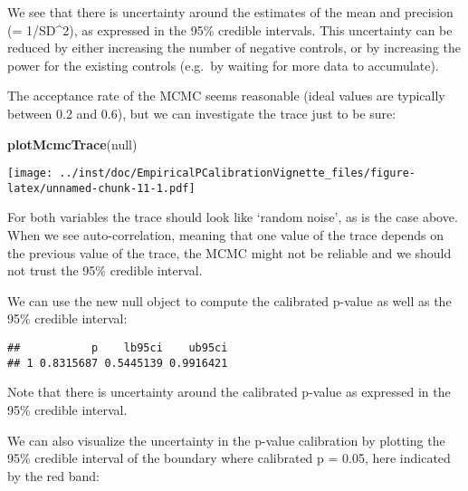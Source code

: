 \documentclass[]{article}
\newenvironment{Shaded}{\begin{snugshade}}{\end{snugshade}}
\newcommand{\DataTypeTok}[1]{\textcolor[rgb]{0.13,0.29,0.53}{#1}}
\newcommand{\KeywordTok}[1]{\textcolor[rgb]{0.13,0.29,0.53}{\textbf{#1}}}
\newcommand{\NormalTok}[1]{#1}
\newcommand{\OperatorTok}[1]{\textcolor[rgb]{0.81,0.36,0.00}{\textbf{#1}}}
\newcommand{\OtherTok}[1]{\textcolor[rgb]{0.56,0.35,0.01}{#1}}
\newcommand{\StringTok}[1]{\textcolor[rgb]{0.31,0.60,0.02}{#1}}
\begin{document}
We see that there is uncertainty around the estimates of the mean and
precision (= 1/SD\^{}2), as expressed in the 95\% credible intervals.
This uncertainty can be reduced by either increasing the number of
negative controls, or by increasing the power for the existing controls
(e.g.~by waiting for more data to accumulate).

The acceptance rate of the MCMC seems reasonable (ideal values are
typically between 0.2 and 0.6), but we can investigate the trace just to
be sure:

\begin{Shaded}
\begin{Highlighting}[]
\KeywordTok{plotMcmcTrace}\NormalTok{(null)}
\end{Highlighting}
\end{Shaded}

\texttt{[image: ../inst/doc/EmpiricalPCalibrationVignette\_files/figure-latex/unnamed-chunk-11-1.pdf]}

For both variables the trace should look like `random noise', as is the
case above. When we see auto-correlation, meaning that one value of the
trace depends on the previous value of the trace, the MCMC might not be
reliable and we should not trust the 95\% credible interval.

We can use the new null object to compute the calibrated p-value as well
as the 95\% credible interval:

\begin{Shaded}
\end{Shaded}

\begin{verbatim}
##           p    lb95ci    ub95ci
## 1 0.8315687 0.5445139 0.9916421
\end{verbatim}

Note that there is uncertainty around the calibrated p-value as
expressed in the 95\% credible interval.

We can also visualize the uncertainty in the p-value calibration by
plotting the 95\% credible interval of the boundary where calibrated p =
0.05, here indicated by the red band:

\begin{Shaded}
\end{Shaded}
\end{document}
